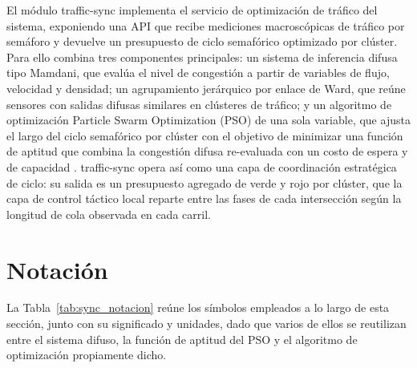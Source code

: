 \label{sec:algoritmos_traffic_sync}

El módulo traffic-sync implementa el servicio de optimización de tráfico del sistema, exponiendo una API que recibe mediciones macroscópicas de tráfico por semáforo y devuelve un presupuesto de ciclo semafórico optimizado por clúster. Para ello combina tres componentes principales: un sistema de inferencia difusa tipo Mamdani, que evalúa el nivel de congestión a partir de variables de flujo, velocidad y densidad; un agrupamiento jerárquico por enlace de Ward, que reúne sensores con salidas difusas similares en clústeres de tráfico; y un algoritmo de optimización Particle Swarm Optimization (PSO) de una sola variable, que ajusta el largo del ciclo semafórico por clúster con el objetivo de minimizar una función de aptitud que combina la congestión difusa re-evaluada con un costo de espera y de capacidad \cite{mamdani1975experiment,zadeh1965fuzzy,kennedy1995particle,ward1963hierarchical}. traffic-sync opera así como una capa de coordinación estratégica de ciclo: su salida es un presupuesto agregado de verde y rojo por clúster, que la capa de control táctico local reparte entre las fases de cada intersección según la longitud de cola observada en cada carril.

\section{Notación}
\label{subsec:sync_notacion}

La Tabla~\ref{tab:sync_notacion} reúne los símbolos empleados a lo largo de esta sección, junto con su significado y unidades, dado que varios de ellos se reutilizan entre el sistema difuso, la función de aptitud del PSO y el algoritmo de optimización propiamente dicho.

